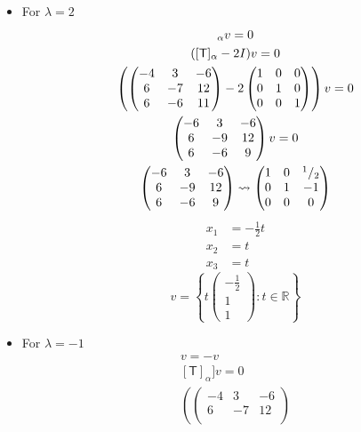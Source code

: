 \begin{enumerate}
\begin{itemize}
\item For $\lambda =2$
\begin{gather}
[\mathsf{T}]_\alpha v = 0\\
([\mathsf{T}]_\alpha -2I)v=0\\
\left(
\begin{pmatrix}
-4 & 3 & -6\\
6 & -7 & 12\\
6 & -6 & 11
\end{pmatrix}
-
2\begin{pmatrix}
1 & 0  &0\\
0 & 1 & 0\\
0 & 0 & 1
\end{pmatrix}
\right)v=0\\
\begin{pmatrix}
-6 & 3 & -6\\
6 & -9 &12\\
6 & -6 & 9
\end{pmatrix}v=0\\
\begin{pmatrix}
-6 & 3 & -6\\
6 & -9 &12\\
6 & -6 & 9
\end{pmatrix}
\leadsto
\begin{pmatrix}
1 & 0 & \mfrac{1}{2}\\
0 & 1 & -1\\
0 & 0 & 0
\end{pmatrix}
\end{gather}
\begin{align}
x_1 &= -\frac{1}{2}t\\
x_2 &= t\\
x_3 &= t
\end{align}
\begin{equation}
v = \left\{t\begin{pmatrix}-\frac{1}{2}\\1\\1\end{pmatrix}\colon t \in \mathbb{R}\right\}
\end{equation}
\item For $\lambda = -1$
\begin{gather}
[\mathsf{T}_\alpha]v = -v\\
[\mathsf{T}]_\alpha]v = 0\\
\left(
\begin{pmatrix}
-4 & 3 & -6\\
6 & -7 & 12\\

\end{pmatrix}
\end{gather}
\end{itemize}
\end{enumerate}
